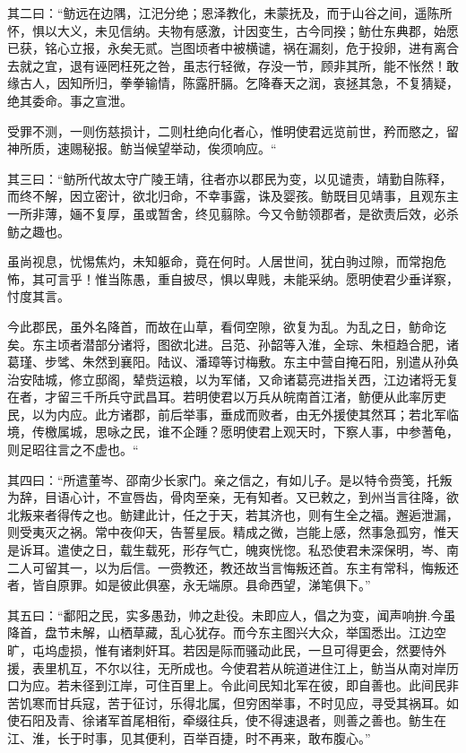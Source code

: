 \documentclass[12pt,UTF8]{ctexbook}
\begin{document}
其二曰：“鲂远在边隅，江汜分绝；恩泽教化，未蒙抚及，而于山谷之间，遥陈所怀，惧以大义，未见信纳。夫物有感激，计因变生，古今同揆；鲂仕东典郡，始愿已获，铭心立报，永矣无贰。岂图顷者中被横谴，祸在漏刻，危于投卵，进有离合去就之宜，退有诬罔枉死之咎，虽志行轻微，存没一节，顾非其所，能不怅然！敢缘古人，因知所归，拳拳输情，陈露肝膈。乞降春天之润，哀拯其急，不复猜疑，绝其委命。事之宣泄。

受罪不测，一则伤慈损计，二则杜绝向化者心，惟明使君远览前世，矜而愍之，留神所质，速赐秘报。鲂当候望举动，俟须响应。“

其三曰：“鲂所代故太守广陵王靖，往者亦以郡民为变，以见谴责，靖勤自陈释，而终不解，因立密计，欲北归命，不幸事露，诛及婴孩。鲂既目见靖事，且观东主一所非薄，婳不复厚，虽或暂舍，终见翦除。今又令鲂领郡者，是欲责后效，必杀鲂之趣也。

虽尚视息，忧惕焦灼，未知躯命，竟在何时。人居世间，犹白驹过隙，而常抱危怖，其可言乎！惟当陈愚，重自披尽，惧以卑贱，未能采纳。愿明使君少垂详察，忖度其言。

今此郡民，虽外名降首，而故在山草，看伺空隙，欲复为乱。为乱之日，鲂命讫矣。东主顷者潜部分诸将，图欲北进。吕范、孙韶等入淮，全琮、朱桓趋合肥，诸葛瑾、步骘、朱然到襄阳。陆议、潘璋等讨梅敷。东主中营自掩石阳，别遣从孙奂治安陆城，修立邸阁，辇赀运粮，以为军储，又命诸葛亮进指关西，江边诸将无复在者，才留三千所兵守武昌耳。若明使君以万兵从皖南首江渚，鲂便从此率厉吏民，以为内应。此方诸郡，前后举事，垂成而败者，由无外援使其然耳；若北军临境，传檄属城，思咏之民，谁不企踵？愿明使君上观天时，下察人事，中参蓍龟，则足昭往言之不虚也。“

其四曰：“所遣董岑、邵南少长家门。亲之信之，有如儿子。是以特令赍笺，托叛为辞，目语心计，不宣唇齿，骨肉至亲，无有知者。又已敕之，到州当言往降，欲北叛来者得传之也。鲂建此计，任之于天，若其济也，则有生全之福。邂逅泄漏，则受夷灭之祸。常中夜仰天，告誓星辰。精成之微，岂能上感，然事急孤穷，惟天是诉耳。遣使之日，载生载死，形存气亡，魄爽恍惚。私恐使君未深保明，岑、南二人可留其一，以为后信。一赍教还，教还故当言悔叛还首。东主有常科，悔叛还者，皆自原罪。如是彼此俱塞，永无端原。县命西望，涕笔俱下。”

其五曰：“鄱阳之民，实多愚劲，帅之赴役。未即应人，倡之为变，闻声响拚.今虽降首，盘节未解，山栖草藏，乱心犹存。而今东主图兴大众，举国悉出。江边空旷，屯坞虚损，惟有诸刺奸耳。若因是际而骚动此民，一旦可得更会，然要恃外援，表里机互，不尔以往，无所成也。今使君若从皖道进住江上，鲂当从南对岸历口为应。若未径到江岸，可住百里上。令此间民知北军在彼，即自善也。此间民非苦饥寒而甘兵寇，苦于征讨，乐得北属，但穷困举事，不时见应，寻受其祸耳。如使石阳及青、徐诸军首尾相衔，牵缀往兵，使不得速退者，则善之善也。鲂生在江、淮，长于时事，见其便利，百举百捷，时不再来，敢布腹心。”
\end{document}
